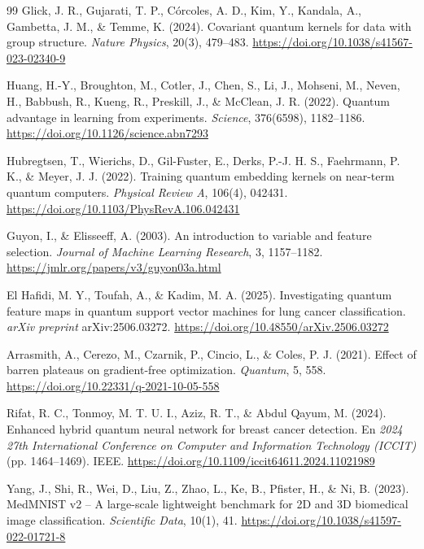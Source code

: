 \begin{thebibliography}{99}
    Glick, J. R., Gujarati, T. P., C{\'{o}}rcoles, A. D., Kim, Y., Kandala, A., Gambetta, J. M., \& Temme, K. (2024).
    Covariant quantum kernels for data with group structure.
    \textit{Nature Physics}, 20(3), 479--483.
    \url{https://doi.org/10.1038/s41567-023-02340-9}

    Huang, H.-Y., Broughton, M., Cotler, J., Chen, S., Li, J., Mohseni, M., Neven, H., Babbush, R., Kueng, R., Preskill, J., \& McClean, J. R. (2022).
    Quantum advantage in learning from experiments.
    \textit{Science}, 376(6598), 1182--1186.
    \url{https://doi.org/10.1126/science.abn7293}

    Hubregtsen, T., Wierichs, D., Gil-Fuster, E., Derks, P.-J. H. S., Faehrmann, P. K., \& Meyer, J. J. (2022).
    Training quantum embedding kernels on near-term quantum computers.
    \textit{Physical Review A}, 106(4), 042431.
    \url{https://doi.org/10.1103/PhysRevA.106.042431}

    Guyon, I., \& Elisseeff, A. (2003).
    An introduction to variable and feature selection.
    \textit{Journal of Machine Learning Research}, 3, 1157--1182.
    \url{https://jmlr.org/papers/v3/guyon03a.html}

    El Hafidi, M. Y., Toufah, A., \& Kadim, M. A. (2025).
    Investigating quantum feature maps in quantum support vector machines for lung cancer classification.
    \textit{arXiv preprint} arXiv:2506.03272.
    \url{https://doi.org/10.48550/arXiv.2506.03272}

    Arrasmith, A., Cerezo, M., Czarnik, P., Cincio, L., \& Coles, P. J. (2021).
    Effect of barren plateaus on gradient-free optimization.
    \textit{Quantum}, 5, 558.
    \url{https://doi.org/10.22331/q-2021-10-05-558}

    Rifat, R. C., Tonmoy, M. T. U. I., Aziz, R. T., \& Abdul Qayum, M. (2024).
    Enhanced hybrid quantum neural network for breast cancer detection.
    En \textit{2024 27th International Conference on Computer and Information Technology (ICCIT)} (pp. 1464--1469). IEEE.
    \url{https://doi.org/10.1109/iccit64611.2024.11021989}

    Yang, J., Shi, R., Wei, D., Liu, Z., Zhao, L., Ke, B., Pfister, H., \& Ni, B. (2023).
    MedMNIST v2 -- A large-scale lightweight benchmark for 2D and 3D biomedical image classification.
    \textit{Scientific Data}, 10(1), 41.
    \url{https://doi.org/10.1038/s41597-022-01721-8}


\end{thebibliography}
